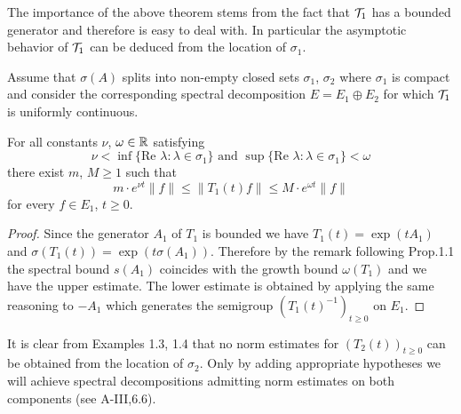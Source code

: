 The importance of the above theorem stems from the fact that $\mathcal{T}_{1}$ has a bounded generator and therefore is easy to deal with.
In particular the asymptotic behavior of $\mathcal{T}_{1}$ can be deduced from the location of $\sigma_{1}$.
\begin{corollary}\label{cor:a3-3.4}
Assume that $\sigma(A)$ splits into non-empty closed sets $\sigma_{1}$, $\sigma_{2}$ where $\sigma_{1}$ is compact and consider the corresponding spectral decomposition $E = E_{1} \oplus E_{2}$ for which $\mathcal{T}_{1}$ is uniformly continuous.

For all constants $\nu$, $\omega \in \mathbb{R}$ satisfying
\[
\nu < \inf \{\text{Re }\lambda \colon \lambda \in \sigma_{1}\} \text{ and } \sup \{\text{Re }\lambda \colon \lambda \in \sigma_{1}\} < \omega
\]
there exist $m$, $M \geq 1$ such that
\[
m \cdot e^{\nu t}\|f\| \leq \|T_{1}(t)f\| \leq M \cdot e^{\omega t}\|f\|
\]
for every $f \in E_{1}$, $t \geq 0$.
\end{corollary}
\begin{proof}
Since the generator $A_{1}$ of $T_{1}$ is bounded we have $T_{1}(t) = \exp(tA_{1})$ and $\sigma(T_{1}(t)) = \exp(t\sigma(A_{1}))$.
Therefore by the remark following Prop.1.1 the spectral bound $s(A_{1})$ coincides with the growth bound $\omega(T_{1})$ and we have the upper estimate.
The lower estimate is obtained by applying the same reasoning to $-A_{1}$ which generates the semigroup $(T_{1}(t)^{-1})_{t \geq 0}$ on $E_{1}$.
\end{proof}
It is clear from Examples 1.3, 1.4 that no norm estimates for $(T_{2}(t))_{t \geq 0}$ can be obtained from the location of $\sigma_{2}$.
Only by adding appropriate hypotheses we will achieve spectral decompositions admitting norm estimates on both components (see A-III,6.6).

